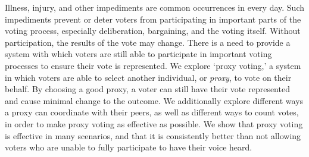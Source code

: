 %
%
%

\begin{publicabstract}

    Illness, injury, and other impediments are common occurrences in every day.
    Such impediments prevent or deter voters from participating in important parts
    of the voting process, especially deliberation, bargaining, and the voting
    itself.
    Without participation, the results of the vote may change.
    There is a need to provide a system with which voters are still able to
    participate in important voting processes to ensure their vote is represented.
    We explore `proxy voting,' a system in which voters are able to select another
    individual, or \textit{proxy}, to vote on their behalf.
    By choosing a good proxy, a voter can still have their vote represented and cause minimal change to the outcome.
    We additionally explore different ways a proxy can coordinate with their peers,
    as well as different ways to count votes, in order to make proxy voting as
    effective as possible.
    We show that proxy voting is effective in many scenarios, and that it is
    consistently better than not allowing voters who are unable to fully participate to
    have their voice heard.

\end{publicabstract}


